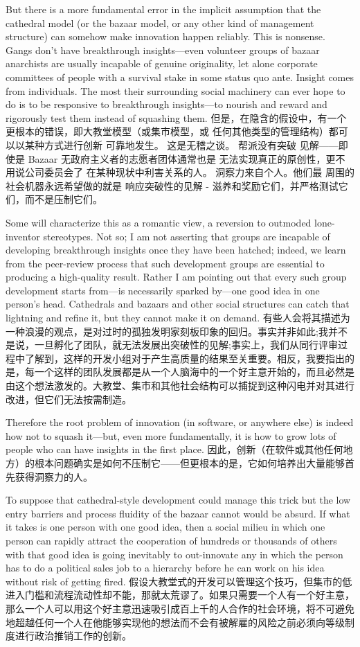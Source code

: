 \documentclass[a4paper,12pt,UTF8,twoside]{ctexbook}
\begin{document}
But there is a more fundamental error in the implicit assumption that the cathedral model (or the bazaar model, or any other kind of management structure) can somehow make innovation happen reliably. This is nonsense. Gangs don't have breakthrough insights—even volunteer groups of bazaar anarchists are usually incapable of genuine originality, let alone corporate committees of people with a survival stake in some status quo ante. Insight comes from individuals. The most their surrounding social machinery can ever hope to do is to be responsive to breakthrough insights—to nourish and reward and rigorously test them instead of squashing them.
但是，在隐含的假设中，有一个更根本的错误，即大教堂模型（或集市模型，或 任何其他类型的管理结构）都可以以某种方式进行创新 可靠地发生。 这是无稽之谈。 帮派没有突破 见解——即使是 Bazaar 无政府主义者的志愿者团体通常也是 无法实现真正的原创性，更不用说公司委员会了 在某种现状中利害关系的人。 洞察力来自个人。他们最 周围的社会机器永远希望做的就是 响应突破性的见解 - 滋养和奖励它们，并严格测试它们，而不是压制它们。

Some will characterize this as a romantic view, a reversion to outmoded lone-inventor stereotypes. Not so; I am not asserting that groups are incapable of developing breakthrough insights once they have been hatched; indeed, we learn from the peer-review process that such development groups are essential to producing a high-quality result. Rather I am pointing out that every such group development starts from—is necessarily sparked by—one good idea in one person's head. Cathedrals and bazaars and other social structures can catch that lightning and refine it, but they cannot make it on demand.
有些人会将其描述为一种浪漫的观点，是对过时的孤独发明家刻板印象的回归。事实并非如此;我并不是说，一旦孵化了团队，就无法发展出突破性的见解;事实上，我们从同行评审过程中了解到，这样的开发小组对于产生高质量的结果至关重要。相反，我要指出的是，每一个这样的团队发展都是从一个人脑海中的一个好主意开始的，而且必然是由这个想法激发的。大教堂、集市和其他社会结构可以捕捉到这种闪电并对其进行改进，但它们无法按需制造。

Therefore the root problem of innovation (in software, or anywhere else) is indeed how not to squash it—but, even more fundamentally, it is how to grow lots of people who can have insights in the first place.
因此，创新（在软件或其他任何地方）的根本问题确实是如何不压制它——但更根本的是，它如何培养出大量能够首先获得洞察力的人。

To suppose that cathedral-style development could manage this trick but the low entry barriers and process fluidity of the bazaar cannot would be absurd. If what it takes is one person with one good idea, then a social milieu in which one person can rapidly attract the cooperation of hundreds or thousands of others with that good idea is going inevitably to out-innovate any in which the person has to do a political sales job to a hierarchy before he can work on his idea without risk of getting fired.
假设大教堂式的开发可以管理这个技巧，但集市的低进入门槛和流程流动性却不能，那就太荒谬了。如果只需要一个人有一个好主意，那么一个人可以用这个好主意迅速吸引成百上千的人合作的社会环境，将不可避免地超越任何一个人在他能够实现他的想法而不会有被解雇的风险之前必须向等级制度进行政治推销工作的创新。
\end{document}

